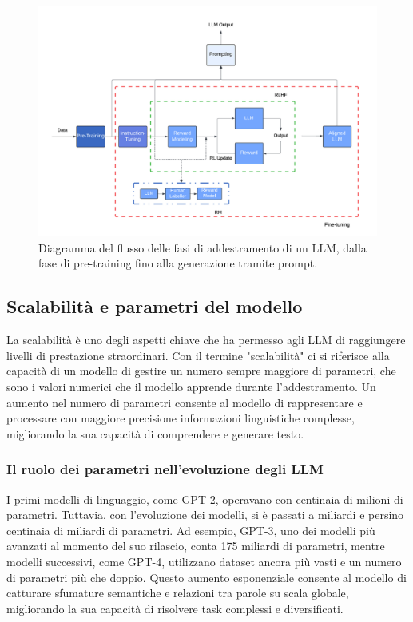 \documentclass[target=mst,aauheader=,style=]{thud}
\begin{document}
\begin{figure}[htbp]
    \centering
    \includegraphics[width=\linewidth]{immagini/pre-training-e-fine-tuning.png}
    \caption{Diagramma del flusso delle fasi di addestramento di un LLM, dalla fase di pre-training fino alla generazione tramite prompt.\cite{hadi_2024}}
    \label{fig:example}
\end{figure}

\subsection{Scalabilità e parametri del modello}
La scalabilità è uno degli aspetti chiave che ha permesso agli LLM di raggiungere livelli di prestazione straordinari. Con il termine "scalabilità" ci si riferisce alla capacità di un modello di gestire un numero sempre maggiore di parametri, che sono i valori numerici che il modello apprende durante l’addestramento. Un aumento nel numero di parametri consente al modello di rappresentare e processare con maggiore precisione informazioni linguistiche complesse, migliorando la sua capacità di comprendere e generare testo.\cite{hadi_2024}

\subsubsection{Il ruolo dei parametri nell'evoluzione degli LLM}
I primi modelli di linguaggio, come GPT-2, operavano con centinaia di milioni di parametri. Tuttavia, con l’evoluzione dei modelli, si è passati a miliardi e persino centinaia di miliardi di parametri. Ad esempio, GPT-3, uno dei modelli più avanzati al momento del suo rilascio, conta 175 miliardi di parametri, mentre modelli successivi, come GPT-4, utilizzano dataset ancora più vasti e un numero di parametri più che doppio. Questo aumento esponenziale consente al modello di catturare sfumature semantiche e relazioni tra parole su scala globale, migliorando la sua capacità di risolvere task complessi e diversificati.\cite{zhao_2023}
\end{document}
